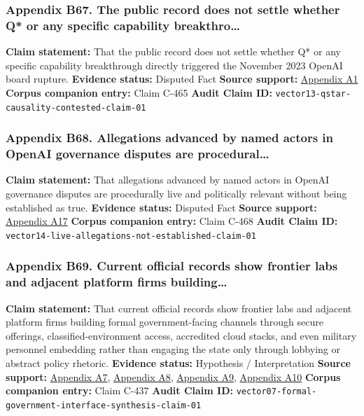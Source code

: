 \documentclass[
  american,
  11pt,
  letterpaper,
]{article}
\begin{document}
\subsubsection{Appendix B67. The public record does not settle whether
Q* or any specific capability
breakthro\ldots{}}\label{appendix-b67-the-public-record-does-not-settle-whether-q-or-any-specific-capability-breakthro}

\textbf{Claim statement:} That the public record does not settle whether
Q* or any specific capability breakthrough directly triggered the
November 2023 OpenAI board rupture. \textbf{Evidence status:} Disputed
Fact \textbf{Source support:}
\hyperref[appendix-a1-openai-announces-leadership-transition]{Appendix
A1} \textbf{Corpus companion entry:} Claim C-465 \textbf{Audit Claim
ID:} \texttt{vector13-qstar-causality-contested-claim-01}

\subsubsection{Appendix B68. Allegations advanced by named actors in
OpenAI governance disputes are
procedural\ldots{}}\label{appendix-b68-allegations-advanced-by-named-actors-in-openai-governance-disputes-are-procedural}

\textbf{Claim statement:} That allegations advanced by named actors in
OpenAI governance disputes are procedurally live and politically
relevant without being established as true. \textbf{Evidence status:}
Disputed Fact \textbf{Source support:}
\hyperref[appendix-a17-musk-v-altman-4-24-cv-04722]{Appendix A17}
\textbf{Corpus companion entry:} Claim C-468 \textbf{Audit Claim ID:}
\texttt{vector14-live-allegations-not-established-claim-01}

\subsubsection{Appendix B69. Current official records show frontier labs
and adjacent platform firms
building\ldots{}}\label{appendix-b69-current-official-records-show-frontier-labs-and-adjacent-platform-firms-building}

\textbf{Claim statement:} That current official records show frontier
labs and adjacent platform firms building formal government-facing
channels through secure offerings, classified-environment access,
accredited cloud stacks, and even military personnel embedding rather
than engaging the state only through lobbying or abstract policy
rhetoric. \textbf{Evidence status:} Hypothesis / Interpretation
\textbf{Source support:}
\hyperref[appendix-a7-introducing-openai-for-government]{Appendix A7},
\hyperref[appendix-a8-claude-gov-models-for-u-s-national-security-customers]{Appendix
A8},
\hyperref[appendix-a9-anthropic-and-palantir-partner-to-bring-claude-ai-models-to-aws-for-u-s-government-intelligence-and-defense-operations]{Appendix
A9},
\hyperref[appendix-a10-army-launches-detachment-201-executive-innovation-corps-to-drive-tech-transformation]{Appendix
A10} \textbf{Corpus companion entry:} Claim C-437 \textbf{Audit Claim
ID:} \texttt{vector07-formal-government-interface-synthesis-claim-01}
\end{document}
